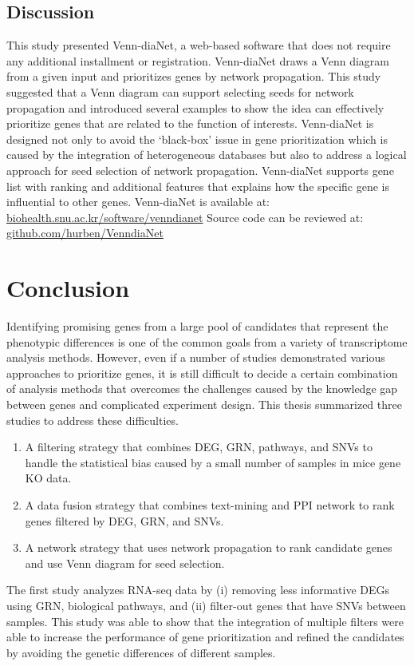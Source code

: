 \documentclass[oneside,phd]{snuthesis}
\begin{document}
\section{Discussion}
This study presented Venn-diaNet, a web-based software that does not require any additional installment or registration. 
Venn-diaNet draws a Venn diagram from a given input and prioritizes genes by network propagation.
This study suggested that a Venn diagram can support selecting seeds for network propagation and introduced several examples to show the idea can effectively prioritize genes that are related to the function of interests.
Venn-diaNet is designed not only to avoid the `black-box' issue in gene prioritization which is caused by the integration of heterogeneous databases but also to address a logical approach for seed selection of network propagation.
Venn-diaNet supports gene list with ranking and additional features that explains how the specific gene is influential to other genes. 
Venn-diaNet is available at: \url{biohealth.snu.ac.kr/software/venndianet}
Source code can be reviewed at: \url{github.com/hurben/VenndiaNet}

\chapter{Conclusion}

Identifying promising genes from a large pool of candidates that represent the phenotypic differences is one of the common goals from a variety of transcriptome analysis methods.
However, even if a number of studies demonstrated various approaches to prioritize genes, it is still difficult to decide a certain combination of analysis methods that overcomes the challenges caused by the knowledge gap between genes and complicated experiment design. This thesis summarized three studies to address these difficulties.
\begin{enumerate}
    \item A filtering strategy that combines DEG, GRN, pathways, and SNVs to handle the statistical bias caused by a small number of samples in mice gene KO data.
    \item A data fusion strategy that combines text-mining and PPI network to rank genes filtered by DEG, GRN, and SNVs.
    \item A network strategy that uses network propagation to rank candidate genes and use Venn diagram for seed selection.
\end{enumerate}
The first study analyzes RNA-seq data by (i) removing less informative DEGs using GRN, biological pathways, and (ii) filter-out genes that have SNVs between samples. 
This study was able to show that the integration of multiple filters were able to increase the performance of gene prioritization and refined the candidates by avoiding the genetic differences of different samples.
\end{document}
